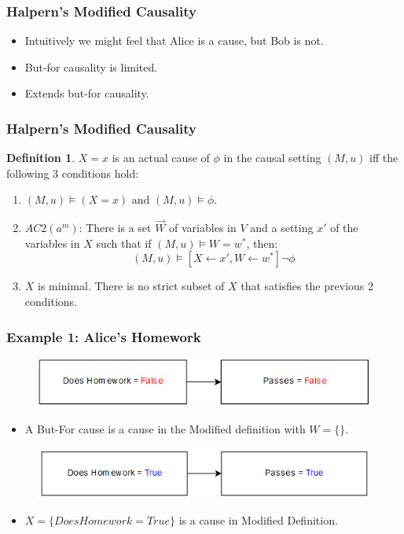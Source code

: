 \documentclass{beamer}
\theoremstyle{plain}
\theoremstyle{definition}
\newtheorem{defn}[thm]{Definition} %
\begin{document}
\begin{frame}
\frametitle{Halpern's Modified Causality}
\begin{itemize}
\item Intuitively we might feel that Alice is a cause, but Bob is not.
\item But-for causality is limited.
\item Extends but-for causality.
\end{itemize}

\end{frame}

\begin{frame}
\frametitle{Halpern's Modified Causality}
\begin{defn}$X=x$ is an actual cause of $\phi$ in the causal setting $(M,u)$ iff the following 3 conditions hold:
\begin{enumerate}
\item $(M,u) \models (X=x)$ and $(M,u) \models \phi$.
\item $AC2(a^m)$: There is a set $\vec{W}$ of variables in $V$ and a setting $x'$ of the variables in $X$ such that if $(M,u) \models W = w^*$, then:
\[
(M,u) \models [X \leftarrow x', W \leftarrow w^*] \neg \phi
\]
\item $X$ is minimal. There is no strict subset of $X$ that satisfies the previous 2 conditions.
\end{enumerate}

\end{defn}
\end{frame}

\begin{frame}
\frametitle{Example 1: Alice's Homework}

\begin{figure}
\includegraphics[scale=.5]{aliceModelReal}
\end{figure}

\begin{itemize}
\item A But-For cause is a cause in the Modified definition with $W=\{\}$.
\end{itemize}

\begin{figure}
\includegraphics[scale=.5]{aliceModelCounterfactual}
\end{figure}

\begin{itemize}
\item $X=\{Does Homework = True\}$ is a cause in Modified Definition.
\end{itemize}


\end{frame}
\end{document}

